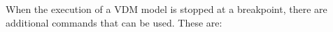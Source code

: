\documentclass{overturerepchap}
\begin{document}





When the execution of a VDM model is stopped at a
breakpoint, there are additional commands that can be used. These are:
\end{document}

